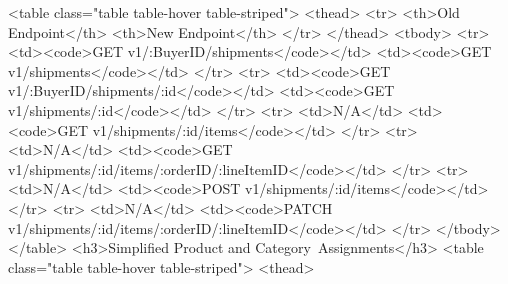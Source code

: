 \documentclass{memoir}%
\begin{document}
<table class="table table{-}hover table{-}striped">\newline%
<thead>\newline%
<tr>\newline%
<th>Old Endpoint</th>\newline%
<th>New Endpoint</th>\newline%
</tr>\newline%
</thead>\newline%
<tbody>\newline%
<tr>\newline%
<td><code>GET v1/:BuyerID/shipments</code></td>\newline%
<td><code>GET v1/shipments</code></td>\newline%
</tr>\newline%
<tr>\newline%
<td><code>GET v1/:BuyerID/shipments/:id</code></td>\newline%
<td><code>GET v1/shipments/:id</code></td>\newline%
</tr>\newline%
<tr>\newline%
<td>N/A</td>\newline%
<td><code>GET v1/shipments/:id/items</code></td>\newline%
</tr>\newline%
<tr>\newline%
<td>N/A</td>\newline%
<td><code>GET v1/shipments/:id/items/:orderID/:lineItemID</code></td>\newline%
</tr>\newline%
<tr>\newline%
<td>N/A</td>\newline%
<td><code>POST v1/shipments/:id/items</code></td>\newline%
</tr>\newline%
<tr>\newline%
<td>N/A</td>\newline%
<td><code>PATCH v1/shipments/:id/items/:orderID/:lineItemID</code></td>\newline%
</tr>\newline%
</tbody>\newline%
</table>\newline%
<h3>Simplified Product and Category~Assignments</h3>\newline%
<table class="table table{-}hover table{-}striped">\newline%
<thead>\newline%
\end{document}
